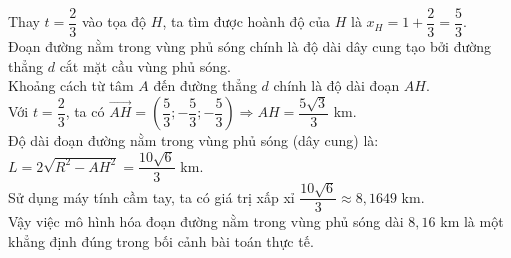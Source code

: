 \begin{ex}
{\begin{itemchoice}
			Thay $t = \dfrac{2}{3}$ vào tọa độ $H$, ta tìm được hoành độ của $H$ là $x_H = 1 + \dfrac{2}{3} = \dfrac{5}{3}$.
			\\
			Đoạn đường nằm trong vùng phủ sóng chính là độ dài dây cung tạo bởi đường thẳng $d$ cắt mặt cầu vùng phủ sóng.\\
			Khoảng cách từ tâm $A$ đến đường thẳng $d$ chính là độ dài đoạn $AH$.\\
			Với $t = \dfrac{2}{3}$, ta có $\overrightarrow{AH} = \left(\dfrac{5}{3}; -\dfrac{5}{3}; -\dfrac{5}{3}\right) \Rightarrow AH = \dfrac{5\sqrt{3}}{3}$ km.\\
			Độ dài đoạn đường nằm trong vùng phủ sóng (dây cung) là:\\
			$L = 2\sqrt{R^2 - AH^2} = \dfrac{10\sqrt{6}}{3}$ km.\\
			Sử dụng máy tính cầm tay, ta có giá trị xấp xỉ $\dfrac{10\sqrt{6}}{3} \approx 8{,}1649$ km.\\
			Vậy việc mô hình hóa đoạn đường nằm trong vùng phủ sóng dài $8{,}16$ km là một khẳng định đúng trong bối cảnh bài toán thực tế.
		\end{itemchoice}
	}
\end{ex}
\caukq
